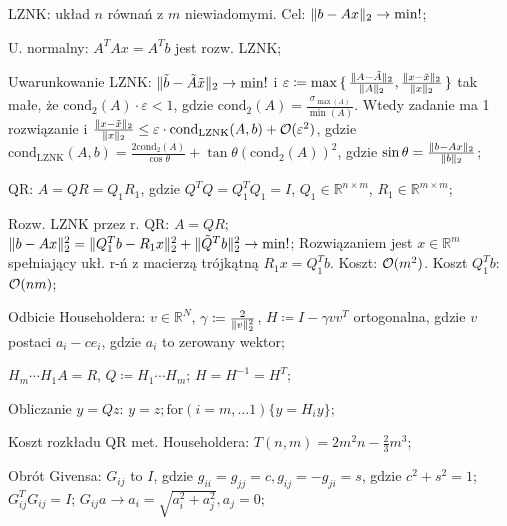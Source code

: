
\entry
LZNK: układ $n$ równań z $m$ niewiadomymi.
Cel: $\|b - Ax\|_2 \to \min !$;

\entry
U. normalny:
$A^TAx=A^Tb$
jest rozw. LZNK;

\entry
Uwarunkowanie LZNK:
$\|\tilde{b} - \tilde{A}\tilde{x}\|_2 \to \mathrm{min}!$
i $\varepsilon\coloneqq \max\set{ \frac{\|A - \tilde{A}\|_2}{\|A\|_2}, \frac{\|x - \tilde{x}\|_2}{\|x\|_2} }$
tak małe, że $\mathrm{cond}_2(A)\cdot \varepsilon < 1$,
gdzie $\mathrm{cond}_2(A) = \frac{\sigma_{\max(A)}}{\min(A)}$.
Wtedy zadanie ma 1 rozwiązanie i
$\frac{\|x-\tilde{x}\|_2}{\|x\|_2} \leq  \varepsilon \cdot \mathrm{cond}_{\mathrm{LZNK}}(A,b)+ \mathcal{O}(\varepsilon^2)$,
gdzie $\mathrm{cond}_{\mathrm{LZNK}}(A,b) = \frac{2\mathrm{cond}_2(A)}{\cos\theta} + \tan\theta(\mathrm{cond}_2(A))^2$,
gdzie $\sin\theta=\frac{\|b-Ax\|_2}{\|b\|_2}$;

\entry
QR:
$A = QR = Q_1R_1$,
gdzie
$Q^TQ=Q^T_1Q_1=I$,
$Q_1\in\mathbb{R}^{n\times m}$,
$R_1\in\mathbb{R}^{m\times m}$;

\entry
Rozw. LZNK przez r. QR:
$A=QR$;
$\|b-Ax\|^2_2 = \|Q^T_1b-R_1x\|^2_2 + \|\tilde{Q}^Tb\|^2_2 \to \min !$;
Rozwiązaniem jest $x\in \mathbb{R}^m$ spełniający ukł. r-ń z macierzą trójkątną $R_1x=Q_1^Tb$.
Koszt: $\mathcal{O}(m^2)$.
Koszt $Q_1^Tb$: $\mathcal{O}(nm)$;


\entry
Odbicie Householdera:
$v\in \mathbb{R}^N$,
$\gamma \coloneqq \frac{2}{\|v\|^2_2} $,
$H\coloneqq I-\gamma vv^T$ ortogonalna, gdzie
$v$ postaci $a_i-ce_i$,
gdzie $a_i$ to zerowany wektor;

\entry
$H_m \cdots H_1 A = R$, $Q \coloneqq H_1 \cdots H_m$;
\entry
$H=H^{-1}=H^T$;

\entry
Obliczanie $y=Qz$:
$y=z; \mathrm{for}(i=m,\ldots 1)\{y=H_iy\}$;

\entry
Koszt rozkładu QR met. Householdera: $T(n,m)=2m^2n - \frac{2}{3}m^3$;

\entry
Obrót Givensa:
$G_{ij}$ to $I$,
gdzie
$g_{ii}=g_{jj}=c, g_{ij}=-g_{ji}=s$,
gdzie
$c^2+s^2=1$;
\entry
$G_{ij}^TG_{ij}=I$;
\entry
$G_{ij}a \to a_i=\sqrt{a_i^2 + a_j^2}, a_j=0$;

